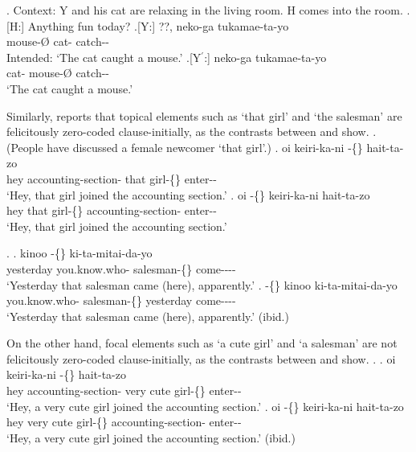 %
\ex. Context: Y and his cat are relaxing in the living room.
	H comes into the room.
	\a.[H:] Anything fun today?
	\bg.[Y:] ??, neko-ga tukamae-ta-yo \\
		mouse-{\O} cat- catch-- \\
		Intended: `The cat caught a mouse.'
	\bg.[Y$^{\prime}$:] neko-ga  tukamae-ta-yo \\
		cat- mouse-{\O} catch-- \\
		`The cat caught a mouse.'


Similarly,
 reports that topical elements such as
 `that girl' and  `the salesman' are felicitously zero-coded clause-initially,
as the contrasts between \Next[a--b] and \NNext[a--b] show.
%
\ex.\label{Par:Ex:Anoko} (People have discussed a female newcomer  `that girl'.)
 \ag. oi keiri-ka-ni  -\{\} hait-ta-zo \\
      hey accounting-section- that girl-\{\} enter--\\
      `Hey, that girl joined the accounting section.'
 \bg. oi  -\{\} keiri-ka-ni hait-ta-zo \\
      hey that girl-\{\} accounting-section- enter--\\
      `Hey, that girl joined the accounting section.'
      \hfill{\cite[293-294]{niwa06}}

\ex.\label{Par:Ex:Seerusuman}
 \ag. kinoo  -\{\} ki-ta-mitai-da-yo \\
      yesterday you.know.who- salesman-\{\} come---- \\
      `Yesterday that salesman came (here), apparently.'
 \bg.  -\{\} kinoo ki-ta-mitai-da-yo \\
      you.know.who- salesman-\{\} yesterday come---- \\
      `Yesterday that salesman came (here), apparently.'
      \hfill{(ibid.)}


On the other hand, focal elements such as  `a cute girl' and  `a salesman' are not felicitously zero-coded clause-initially, as the contrasts between \Next[a--b] and \NNext[a--b] show.
%
\ex.
 \ag. oi keiri-ka-ni   -\{\} hait-ta-zo \\
      hey accounting-section- very cute girl-\{\} enter--\\
      `Hey, a very cute girl joined the accounting section.'
 \bg. oi   -\{\} keiri-ka-ni hait-ta-zo \\
      hey very cute girl-\{\} accounting-section- enter--\\
      `Hey, a very cute girl joined the accounting section.'
      \hfill{(ibid.)}

